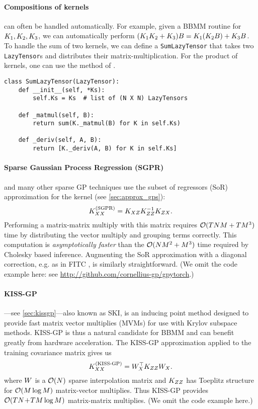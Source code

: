 \paragraph{Compositions of kernels} can often be handled automatically.
For example, given a BBMM routine for $K_{1},K_{2},K_{3}$, we can automatically perform $(K_{1}K_{2}+K_{3}) B = K_{1}(K_{2} B ) + K_{3} B$.
To handle the sum of two kernels, we can define a {\tt SumLazyTensor} that takes two {\tt LazyTensor}s and distributes their matrix-multiplication.
For the product of kernels, one can use the method of \citet{gardner2018product}.
%
\begin{verbatim}
class SumLazyTensor(LazyTensor):
    def __init__(self, *Ks):
        self.Ks = Ks  # list of (N X N) LazyTensors

    def _matmul(self, B):
        return sum(K._matmul(B) for K in self.Ks)

    def _deriv(self, A, B):
        return [K._deriv(A, B) for K in self.Ks]
\end{verbatim}

\paragraph{Sparse Gaussian Process Regression (SGPR)}
\cite{titsias2009variational} and many other sparse GP techniques \cite{quinonero2005unifying,snelson2006sparse,hensman2013gaussian} use the subset of regressors (SoR) approximation for the kernel (see \cref{sec:approx_gps}):
\[
  K_{XX}^{(\text{SGPR})} = K_{XZ} K_{ZZ}^{-1} K_{ZX}.
\]
Performing a matrix-matrix multiply with this matrix requires $\bigo{TNM + TM^{3}}$ time by distributing the vector multiply and grouping terms correctly.
This computation is \emph{asymptotically faster} than the $\bigo{NM^{2} + M^{3}}$ time required by Cholesky based inference.
Augmenting the SoR approximation with a diagonal correction, e.g. as in FITC \cite{snelson2006sparse}, is similarly straightforward.
(We omit the code example here: see \url{http://github.com/cornellius-gp/gpytorch}.)

\paragraph{KISS-GP}
\cite{wilson2015kernel}---see \cref{sec:kissgp}---also known as SKI, is an inducing point method designed to provide fast matrix vector multiplies (MVMs) for use with Krylov subspace methods.
KISS-GP is thus a natural candidate for BBMM and can benefit greatly from hardware acceleration.
The KISS-GP approximation applied to the training covariance matrix gives us
\[
  K_{XX}^{(\text{KISS-GP})} = W_{X}^\top K_{ZZ} W_{X}.
\]
where $W$ is a $\bigo{N}$ sparse interpolation matrix and $K_{ZZ}$ has Toeplitz structure for $\bigo{M \log M}$ matrix-vector multiplies.
Thus KISS-GP provides $\bigo{TN \! + \! TM \log M}$ matrix-matrix multiplies.
(We omit the code example here.)



